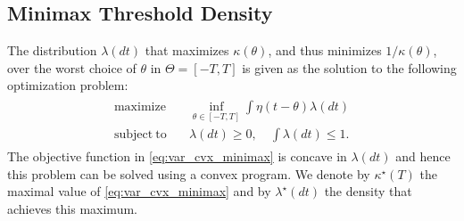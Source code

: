 \subsection{Minimax Threshold Density}
The distribution $\lambda(dt)$ that maximizes $\kappa(\theta)$, and thus minimizes $1/\kappa(\theta)$, over the worst choice of $\theta$ in $\Theta = [-T,T]$ is given as the solution to the following optimization problem:
\begin{align}
\label{eq:var_cvx_minimax}
\begin{split}
\mathrm{maximize} \quad &  \inf_{\theta \in [-T,T]} \int \eta(t-\theta) \lambda(dt)
\\ 
\mathrm{subject~to} 
\quad & \lambda(dt)\geq 0,\quad \int \lambda(dt) \leq 1. 
\end{split}
\end{align}
The objective function in \eqref{eq:var_cvx_minimax} is concave in $\lambda(dt)$ and hence this problem can be solved using a convex program. We denote by $\kappa^\star(T)$ the maximal value of \eqref{eq:var_cvx_minimax} and by $\lambda^\star(dt)$ the density that achieves this maximum.  
%

